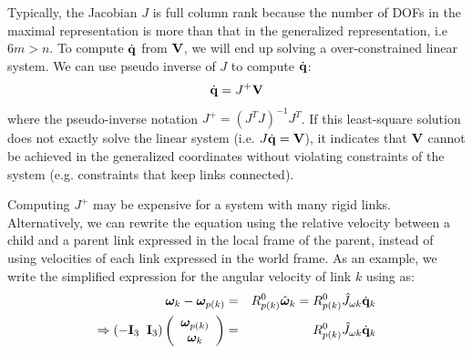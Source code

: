 Typically, the Jacobian $J$ is full column rank because the
number of DOFs in the maximal representation is more than that in the
generalized representation, i.e $6m > n$. To compute $\dot{\mathbf{q}}$ from $\mathbf{V}$, we
will end up solving a over-constrained linear system. We can use
pseudo inverse of $J$ to compute $\dot{\mathbf{q}}$:
\begin{equation}
 \dot{\mathbf{q}} =  J^+\mathbf{V}
 \end{equation}
where the pseudo-inverse notation $J^+ = (J^TJ)^{-1}J^T$. If this
least-square solution does not exactly solve the linear
system (i.e. $J \dot{\mathbf{q}} = \mathbf{V}$), it indicates that $\mathbf{V}$ cannot be achieved in the
generalized coordinates without violating constraints of the system
(e.g. constraints that keep links connected).

Computing $J^+$ may be expensive for a system with many rigid links. 
Alternatively, we can rewrite the equation using the relative velocity between a child and a parent link expressed in the local
frame of the parent, instead of using velocities of each link
expressed in the world frame. As an example, we write the simplified expression for the angular velocity of link $k$ using  as: 
\begin{eqnarray}
\nonumber
\bm{\omega}_k - \bm{\omega}_{p(k)} & = & R^0_{p(k)}\hat{\bm{\omega}}_k = R^0_{p(k)}\hat{J}_{\omega k} \dot{\mathbf{q}}_k \\
\Rightarrow \left ( -\mathbf{I}_3\;\; \mathbf{I}_3 \right ) 
\left ( 
\begin{array}{c}
\bm{\omega}_{p(k)}\\
\bm{\omega}_k
\end{array}
\right ) & = & R^0_{p(k)}\hat{J}_{\omega k} \dot{\mathbf{q}}_k
\end{eqnarray}


